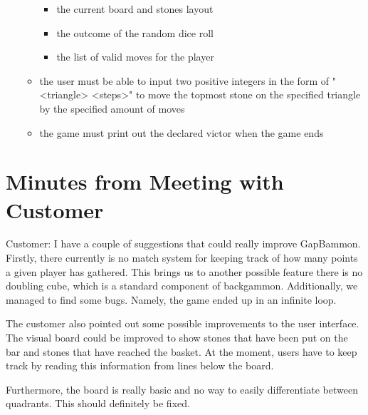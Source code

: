 \documentclass[11pt]{article}
\begin{document}
\begin{itemize}
\begin{itemize}
\begin{itemize}
\item the current board and stones layout
\item the outcome of the random dice roll
\item the list of valid moves for the player
\end{itemize}
\item the user must be able to input two positive integers in the form of "<triangle> <steps>" to move the topmost stone on the specified triangle by the specified amount of moves
\item the game must print out the declared victor when the game ends
\end{itemize}
\end{itemize}

\newpage

\section{Minutes from Meeting with Customer}

\hspace{1.5em}Customer: I have a couple of suggestions that could really improve GapBammon.\\
Firstly, there currently is no match system for keeping track of how many points a given player has gathered.
This brings us to another possible feature there is no doubling cube, which is a standard component of backgammon.
Additionally, we managed to find some bugs. Namely, the game ended up in an infinite loop.
   
The customer also pointed out some possible improvements to the user interface. The visual board could be improved to show stones that have been put on the bar and stones that have reached the basket. At the moment, users have to keep track by reading this information from lines below the board. 

Furthermore, the board is really basic and no way to easily differentiate between quadrants. This should definitely be fixed. 
\end{document}
